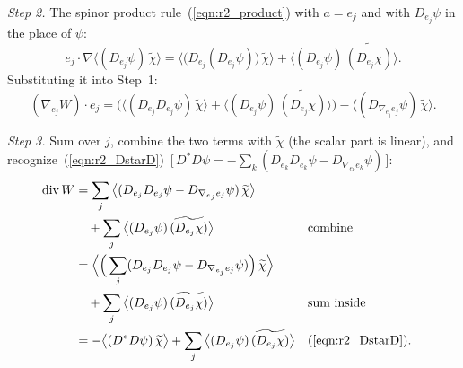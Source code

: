 \emph{Step 2.} The spinor product rule~(\ref{eqn:r2_product}) with $a = e_j$ and with $D_{e_j}\psi$ in the place of $\psi$:
\begin{equation*}
e_j\cdot\nabla\big\langle (D_{e_j}\psi)\,\widetilde\chi\big\rangle = \big\langle \big(D_{e_j}(D_{e_j}\psi)\big)\,\widetilde\chi\big\rangle + \big\langle (D_{e_j}\psi)\,\widetilde{(D_{e_j}\chi)}\big\rangle .
\end{equation*}
Substituting it into Step~1:
\begin{equation*}
(\nabla_{e_j}W)\cdot e_j = \Big(\big\langle (D_{e_j}D_{e_j}\psi)\,\widetilde\chi\big\rangle + \big\langle (D_{e_j}\psi)\,\widetilde{(D_{e_j}\chi)}\big\rangle\Big) - \big\langle (D_{\nabla_{e_j}e_j}\psi)\,\widetilde\chi\big\rangle .
\end{equation*}

\emph{Step 3.} Sum over $j$, combine the two terms with $\widetilde\chi$ (the scalar part is linear), and recognize~(\ref{eqn:r2_DstarD})~[\,$D^*D\psi = -\sum_k(D_{e_k}D_{e_k}\psi - D_{\nabla_{e_k}e_k}\psi)$\,]:
\begin{align*}
\operatorname{div}W &= \sum_j\big\langle (D_{e_j}D_{e_j}\psi - D_{\nabla_{e_j}e_j}\psi)\,\widetilde\chi\big\rangle \\
&\quad + \sum_j\big\langle (D_{e_j}\psi)\,\widetilde{(D_{e_j}\chi)}\big\rangle && \text{combine} \\
&= \Big\langle \Big(\sum_j (D_{e_j}D_{e_j}\psi - D_{\nabla_{e_j}e_j}\psi)\Big)\,\widetilde\chi\Big\rangle \\
&\quad + \sum_j\big\langle (D_{e_j}\psi)\,\widetilde{(D_{e_j}\chi)}\big\rangle && \text{sum inside} \\
&= -\big\langle (D^*D\psi)\,\widetilde\chi\big\rangle + \sum_j\big\langle (D_{e_j}\psi)\,\widetilde{(D_{e_j}\chi)}\big\rangle && (\ref{eqn:r2_DstarD}) .
\end{align*}

